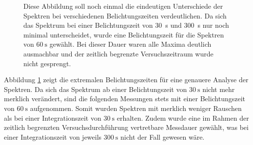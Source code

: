 \begin{figure}[H]
    \centering
    \resizebox{0.8\textwidth}{!}{}   
    \caption[Eindeutige Unterschiede der Spektren bei verschiedenen Belichtungszeiten]{Diese Abbildung soll noch einmal die eindeutigen Unterschiede der Spektren bei verschiedenen Belichtungszeiten verdeutlichen. Da sich das Spektrum bei einer Belichtungszeit von \SI{30}{\second} und \SI{300}{\second} nur noch minimal unterscheidet, wurde eine Belichtungszeit für die Spektren von $\SI{60}{\second}$ gewählt. Bei dieser Dauer waren alle Maxima deutlich ausmachbar und der zeitlich begrenzte Versuchszeitraum wurde nicht gesprengt.}
    \label{fig:BelichtungszeitExtremal}
\end{figure}

Abbildung \ref{fig:BelichtungszeitExtremal} zeigt die extremalen Belichtungszeiten für eine genauere Analyse der Spektren. 
Da sich das Spektrum ab einer Belichtungszeit von $\SI{30}{\second}$ nicht mehr merklich verändert, sind die folgenden Messungen stets mit einer Belichtungszeit von $\SI{60}{\second}$ aufgenommen.
Somit wurden Spektren mit merklich weniger Rauschen als bei einer Integrationszeit von $\SI{30}{\second}$ erhalten. Zudem wurde eine im Rahmen der zeitlich begrenzten Versuchsdurchführung vertretbare Messdauer gewählt, was bei einer Integrationszeit von jeweils $\SI{300}{\second}$ nicht der Fall gewesen wäre.

